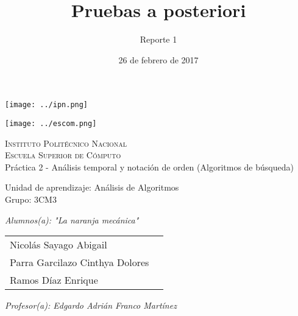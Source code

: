 \documentclass[12pt]{article}
\date{26 de febrero de 2017}
\title{Pruebas a posteriori}
\author{Reporte 1}
\begin{document}
		\begin{titlepage}
			\begin{center}
				
				
				\noindent
				\begin{minipage}{0.5\textwidth}
					\begin{flushleft} \large
						\texttt{[image: ../ipn.png]}
					\end{flushleft}
				\end{minipage}%
				\begin{minipage}{0.55\textwidth}
					\begin{flushright} \large
						\texttt{[image: ../escom.png]}
					\end{flushright}
				\end{minipage}
				
				\textsc{\LARGE Instituto Politécnico Nacional}\\[0.5cm]
				
				\textsc{\Large Escuela Superior de Cómputo}\\[1cm]
				
				
				{ \huge Práctica 2 - Análisis temporal y notación de orden (Algoritmos de búsqueda)\\[1cm] }
				
				{ \Large Unidad de aprendizaje: Análisis de Algoritmos} \\[1cm]
				
				{ \Large Grupo: 3CM3} \\[1cm]
				
				\noindent
				\begin{minipage}{0.5\textwidth}
					\begin{flushleft} \large
						\emph{Alumnos(a): "La naranja mecánica"}\\
						
						\begin{tabular}{ll}
					     Nicolás Sayago Abigail\\
					     Parra Garcilazo Cinthya Dolores\\
					     Ramos Díaz Enrique \\
					
					\end{tabular}
					\end{flushleft}
				\end{minipage}%
				\begin{minipage}{0.5\textwidth}
					\begin{flushright} \large
						\emph{Profesor(a): Edgardo Adrián Franco Martínez} \\
						  \\
					\end{flushright}
				\end{minipage}
				

\end{center}
\end{titlepage}
\end{document}
